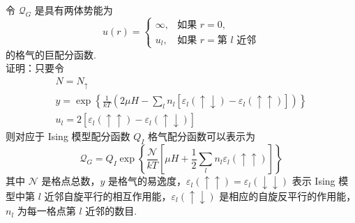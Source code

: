 \documentclass{assignment}
\begin{document}
\begin{prob}
    令 $\mathcal{Q}_G$ 是具有两体势能为
    \[
        u(r)=\left\{\begin{array}{ll}
            \infty,&\text{如果 }r=0,\\
            u_l,&\text{如果 }r=\text{第 }l\text{ 近邻}
        \end{array}\right.
    \]
    的格气的巨配分函数.\\
    证明：只要令
    \begin{gather*}
        N=N_{\uparrow}\\
        y=\exp\left\{\frac{1}{kT}\left(2\mu H-\sum_ln_l[\varepsilon_l(\uparrow\downarrow)-\varepsilon_l(\uparrow\uparrow)]\right)\right\}\\
        u_l=2[\varepsilon_l(\uparrow\uparrow)-\varepsilon_l(\uparrow\downarrow)]
    \end{gather*}
    则对应于 Ising 模型配分函数 $Q_I$ 格气配分函数可以表示为
    \[
        \mathcal{Q}_{G}=Q_I\exp\left\{\frac{\mathcal{N}}{kT}\left[\mu H+\frac{1}{2}\sum_ln_l\varepsilon_l(\uparrow\uparrow)\right]\right\}
    \]
    其中 $\mathcal{N}$ 是格点总数，$y$ 是格气的易逸度，$\varepsilon_l(\uparrow\uparrow)=\varepsilon_l(\downarrow\downarrow)$ 表示 Ising 模型中第 $l$ 近邻自旋平行的相互作用能，$\varepsilon_l(\uparrow\downarrow)$ 是相应的自旋反平行的作用能，$n_l$ 为每一格点第 $l$ 近邻的数目.
\end{prob}
\end{document}
